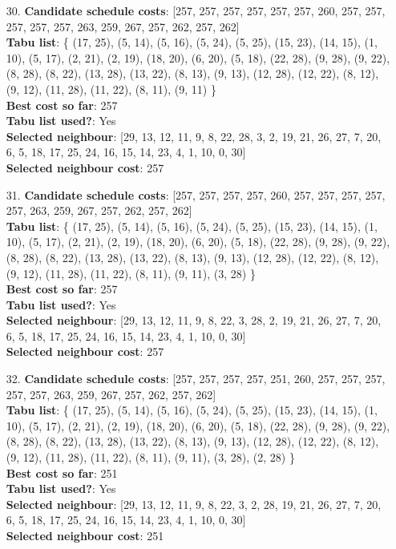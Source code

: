 \documentclass[fleqn]{article}
\begin{document}
\begin{itemize}
    \item[30.] \textbf{Candidate schedule costs}: [257, 257, 257, 257, 257, 257, 260, 257, 257, 257, 257, 257, 263, 259, 267, 257, 262, 257, 262] \\
    \textbf{Tabu list}: \{ (17, 25), (5, 14), (5, 16), (5, 24), (5, 25), (15, 23), (14, 15), (1, 10), (5, 17), (2, 21), (2, 19), (18, 20), (6, 20), (5, 18), (22, 28), (9, 28), (9, 22), (8, 28), (8, 22), (13, 28), (13, 22), (8, 13), (9, 13), (12, 28), (12, 22), (8, 12), (9, 12), (11, 28), (11, 22), (8, 11), (9, 11) \} \\
    \textbf{Best cost so far}: 257 \\
    \textbf{Tabu list used?}: Yes \\
    \textbf{Selected neighbour}: [29, 13, 12, 11, 9, 8, 22, 28, 3, 2, 19, 21, 26, 27, 7, 20, 6, 5, 18, 17, 25, 24, 16, 15, 14, 23, 4, 1, 10, 0, 30] \\
    \textbf{Selected neighbour cost}: 257
      

    \item[31.] \textbf{Candidate schedule costs}: [257, 257, 257, 257, 260, 257, 257, 257, 257, 257, 263, 259, 267, 257, 262, 257, 262] \\
    \textbf{Tabu list}: \{ (17, 25), (5, 14), (5, 16), (5, 24), (5, 25), (15, 23), (14, 15), (1, 10), (5, 17), (2, 21), (2, 19), (18, 20), (6, 20), (5, 18), (22, 28), (9, 28), (9, 22), (8, 28), (8, 22), (13, 28), (13, 22), (8, 13), (9, 13), (12, 28), (12, 22), (8, 12), (9, 12), (11, 28), (11, 22), (8, 11), (9, 11), (3, 28) \} \\
    \textbf{Best cost so far}: 257 \\
    \textbf{Tabu list used?}: Yes \\
    \textbf{Selected neighbour}: [29, 13, 12, 11, 9, 8, 22, 3, 28, 2, 19, 21, 26, 27, 7, 20, 6, 5, 18, 17, 25, 24, 16, 15, 14, 23, 4, 1, 10, 0, 30] \\
    \textbf{Selected neighbour cost}: 257
      

    \item[32.] \textbf{Candidate schedule costs}: [257, 257, 257, 257, 251, 260, 257, 257, 257, 257, 257, 263, 259, 267, 257, 262, 257, 262] \\
    \textbf{Tabu list}: \{ (17, 25), (5, 14), (5, 16), (5, 24), (5, 25), (15, 23), (14, 15), (1, 10), (5, 17), (2, 21), (2, 19), (18, 20), (6, 20), (5, 18), (22, 28), (9, 28), (9, 22), (8, 28), (8, 22), (13, 28), (13, 22), (8, 13), (9, 13), (12, 28), (12, 22), (8, 12), (9, 12), (11, 28), (11, 22), (8, 11), (9, 11), (3, 28), (2, 28) \} \\
    \textbf{Best cost so far}: 251 \\
    \textbf{Tabu list used?}: Yes \\
    \textbf{Selected neighbour}: [29, 13, 12, 11, 9, 8, 22, 3, 2, 28, 19, 21, 26, 27, 7, 20, 6, 5, 18, 17, 25, 24, 16, 15, 14, 23, 4, 1, 10, 0, 30] \\
    \textbf{Selected neighbour cost}: 251
      


\end{itemize}
\end{document}
